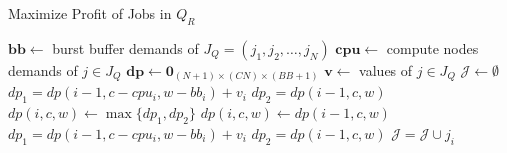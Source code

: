 \begin{algorithm}[t]
\caption{Maximize Profit of Jobs in $Q_R$}
\label{Alg:MaxCPU}
\begin{algorithmic}[1]
        \State $\boldsymbol{bb} \gets $ burst buffer demands of $J_Q = (j_1, j_2,\ldots, j_N)$
        \State $\boldsymbol{cpu} \gets $ compute nodes demands of $j \in J_Q$
        \State $\boldsymbol{dp} \gets \boldsymbol{0}_{(N+1) \times (CN) \times (BB+1)}$
        \State $\boldsymbol{v} \gets$ values of $j \in J_Q$
        \State $\mathcal{J} \gets \emptyset$ 
        \\
                                                \State $dp_1 = dp(i-1, c-cpu_i, w-bb_i)+v_i$
                                                \State $dp_2 = dp(i-1, c, w)$
                                                \State $dp(i, c, w) \gets \max\{dp_1, dp_2\}$
                                        \Else
                                                \State $dp(i,c,w) \gets dp(i-1,c,w)$
                                        \EndIf
                                \EndFor
                        \EndFor
                \EndFor
                \State {}
        \EndFunction
        \\
                                \State $dp_1 = dp(i-1, c-cpu_i, w-bb_i)+v_i$
                                \State $dp_2 = dp(i-1, c, w)$
                                        \State $\mathcal{J} = \mathcal{J} \cup j_i$
                                        \State {}
                                \Else
                                        \State {}
                                \EndIf
                        \Else
                                \State {}
                        \EndIf
                \EndIf
        \EndFunction
\end{algorithmic}
\end{algorithm}

